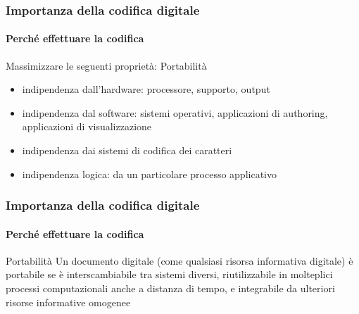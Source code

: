 \begin{frame}
	\frametitle{Importanza della codifica digitale}
	\framesubtitle{Perché effettuare la codifica}
	\addtocounter{nframe}{1}

	\begin{block}{Massimizzare le seguenti proprietà: Portabilità}
		\begin{itemize}
			\item indipendenza dall’hardware: processore, supporto, output
			\item indipendenza dal software: sistemi operativi, applicazioni di authoring, applicazioni di visualizzazione
			\item indipendenza dai sistemi di codifica dei caratteri
			\item indipendenza logica: da un particolare processo applicativo
		\end{itemize}
	\end{block}

\end{frame}






\begin{frame}
	\frametitle{Importanza della codifica digitale}
	\framesubtitle{Perché effettuare la codifica}
	\addtocounter{nframe}{1}

	\begin{block}{Portabilità}
		Un documento digitale (come qualsiasi risorsa informativa digitale) è portabile se è interscambiabile tra sistemi diversi, riutilizzabile in molteplici processi computazionali anche a distanza di tempo, e integrabile da ulteriori risorse informative omogenee
	\end{block}
\end{frame}

